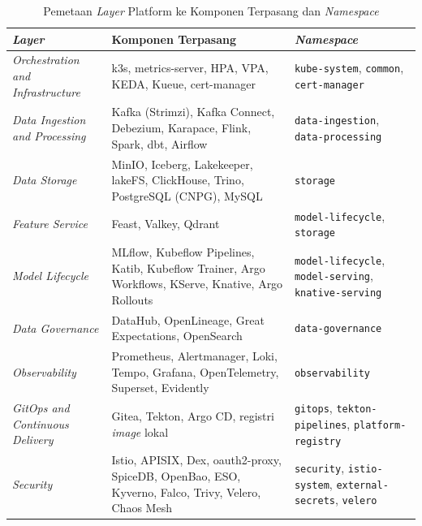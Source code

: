 \begin{table}[!htb]
\centering
\caption{Pemetaan \textit{Layer} Platform ke Komponen Terpasang dan \textit{Namespace}}
\label{tab:impl-layer-map}
\footnotesize
\setlength{\tabcolsep}{3pt}
\begin{tabular}{|>{\raggedright\arraybackslash}m{3.4cm}|>{\raggedright\arraybackslash}m{5.9cm}|>{\raggedright\arraybackslash}m{4.0cm}|}
\hline
\centering\arraybackslash\textbf{\textit{Layer}} & \centering\arraybackslash\textbf{Komponen Terpasang} & \centering\arraybackslash\textbf{\textit{Namespace}} \\
\hline
\textit{Orchestration and Infrastructure} & k3s, metrics-server, HPA, VPA, KEDA, Kueue, cert-manager & \texttt{kube-system}, \texttt{common}, \texttt{cert-manager} \\
\hline
\textit{Data Ingestion and Processing} & Kafka (Strimzi), Kafka Connect, Debezium, Karapace, Flink, Spark, dbt, Airflow & \texttt{data-ingestion}, \texttt{data-processing} \\
\hline
\textit{Data Storage} & MinIO, Iceberg, Lakekeeper, lakeFS, ClickHouse, Trino, PostgreSQL (CNPG), MySQL & \texttt{storage} \\
\hline
\textit{Feature Service} & Feast, Valkey, Qdrant & \texttt{model-lifecycle}, \texttt{storage} \\
\hline
\textit{Model Lifecycle} & MLflow, Kubeflow Pipelines, Katib, Kubeflow Trainer, Argo Workflows, KServe, Knative, Argo Rollouts & \texttt{model-lifecycle}, \texttt{model-serving}, \texttt{knative-serving} \\
\hline
\textit{Data Governance} & DataHub, OpenLineage, Great Expectations, OpenSearch & \texttt{data-governance} \\
\hline
\textit{Observability} & Prometheus, Alertmanager, Loki, Tempo, Grafana, OpenTelemetry, Superset, Evidently & \texttt{observability} \\
\hline
\textit{GitOps and Continuous Delivery} & Gitea, Tekton, Argo CD, registri \textit{image} lokal & \texttt{gitops}, \texttt{tekton-pipelines}, \texttt{platform-registry} \\
\hline
\textit{Security} & Istio, APISIX, Dex, oauth2-proxy, SpiceDB, OpenBao, ESO, Kyverno, Falco, Trivy, Velero, Chaos Mesh & \texttt{security}, \texttt{istio-system}, \texttt{external-secrets}, \texttt{velero} \\
\hline
\end{tabular}
\end{table}
